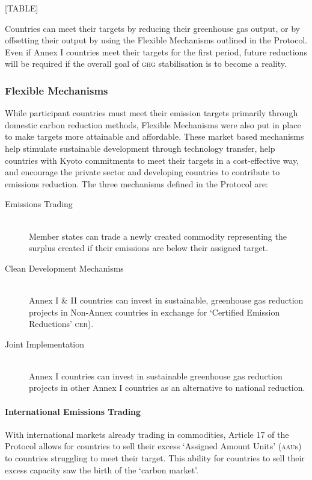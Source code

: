 [TABLE]

Countries can meet their targets by reducing their greenhouse gas output, or by offsetting their output by using the Flexible Mechanisms outlined in the Protocol. Even if Annex I countries meet their targets for the first period, future reductions will be required if the overall goal of \textsc{ghg} stabilisation is to become a reality.

\subsubsection{Flexible Mechanisms}

While participant countries must meet their emission targets primarily through domestic carbon reduction methods, Flexible Mechanisms were also put in place to make targets more attainable and affordable. These market based mechanisms help stimulate sustainable development through technology transfer, help countries with Kyoto commitments to meet their targets in a cost-effective way, and encourage the private sector and developing countries to contribute to emissions reduction. The three mechanisms defined in the Protocol are:

\begin{description}
	\item[Emissions Trading] \hfill \\
	Member states can trade a newly created commodity representing the surplus created if their emissions are below their assigned target.
	
	\item[Clean Development Mechanisms] \hfill \\
	Annex I \& II countries can invest in sustainable, greenhouse gas reduction projects in Non-Annex countries in exchange for `Certified Emission Reductions' \textsc{cer}).~\cite{UNFCCC-05}

	\item[Joint Implementation] \hfill \\
	Annex I countries can invest in sustainable greenhouse gas reduction projects in other Annex I countries as an alternative to national reduction.
\end{description}

\paragraph{International Emissions Trading}

With international markets already trading in commodities, Article 17 of the Protocol allows for countries to sell their excess `Assigned Amount Units' (\textsc{aau}s) to countries struggling to meet their target. This ability for countries to sell their excess capacity saw the birth of the `carbon market'.

